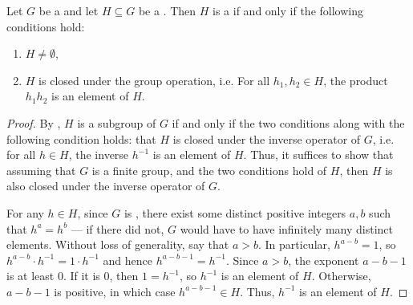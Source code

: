 \begin{proposition} \label{proposition:subgroup_criterion_for_a_subset_of_a_finite_group}
    Let $G$ be a  and let $H \subseteq G$ be a . Then $H$ is a  if and only if the following conditions hold:
    \begin{enumerate}
        \item $H \neq \emptyset$,
        \item $H$ is closed under the group operation, i.e. For all $h_1, h_2 \in H$, the product $h_1 h_2$ is an element of $H$.
    \end{enumerate}
\end{proposition}
\begin{proof}
    By , $H$ is a subgroup of $G$ if and only if the two conditions along with the following condition holds: that $H$ is closed under the inverse operator of $G$, i.e. for all $h \in H$, the inverse $h^{-1}$ is an element of $H$. Thus, it suffices to show that assuming that $G$ is a finite group, and the two conditions hold of $H$, then $H$ is also closed under the inverse operator of $G$.


    For any $h \in H$, since $G$ is , there exist some distinct positive integers $a,b$ such that $h^a = h^b$ --- if there did not, $G$ would have to have infinitely many distinct elements. Without loss of generality, say that $a > b$. In particular, $h^{a-b} = 1$, so $h^{a-b} \cdot h^{-1} = 1 \cdot h^{-1}$ and hence $h^{a-b-1} = h^{-1}$. Since $a > b$, the exponent $a-b-1$ is at least $0$. If it is $0$, then $1 = h^{-1}$, so $h^{-1}$ is an element of $H$. Otherwise, $a-b-1$ is positive, in which case $h^{a-b-1} \in H$. Thus, $h^{-1}$ is an element of $H$.
\end{proof}

